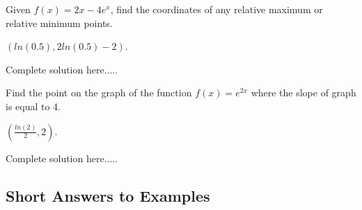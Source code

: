 \newpage
\begin{example}
Given $f(x)=2x-4e^x$, find the coordinates of any relative maximum or relative minimum points. 
    \begin{sol}
    $(ln(0.5),2ln(0.5)-2)$.
    \end{sol}
    \begin{solL}
    Complete solution here.....
    
    \end{solL}
    
\end{example}
\begin{example}
Find the point on the graph of the function $f(x)=e^{2x}$ where the slope of graph is equal to 4.
    \begin{sol}
    $\left(\displaystyle\frac{ln(2)}{2},2\right)$.
    \end{sol}
    \begin{solL}
    Complete solution here.....
    
    \end{solL}
    
\end{example}

\vspace*{\fill}

\subsection*{Short Answers to Examples}
\begin{multicols}{2}

\end{multicols}


